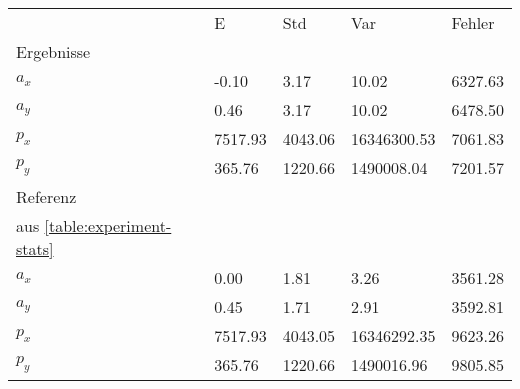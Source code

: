 \begin{tabular}{l|l|l|l|l}

     & E   & Std    & Var    & Fehler \\
\hhline{=|=|=|=|=}

Ergebnisse & & & & \\
$a_x$  &        -0.10 &         3.17 &        10.02 &      6327.63 \\
$a_y$  &         0.46 &         3.17 &        10.02 &      6478.50 \\
$p_x$  &      7517.93 &      4043.06 &  16346300.53 &      7061.83 \\
$p_y$  &       365.76 &      1220.66 &   1490008.04 &      7201.57 \\

\hline
Referenz & & & & \\
aus \ref{table:experiment-stats} & & & & \\
$a_x$  &         0.00 &         1.81 &         3.26 &      3561.28 \\
$a_y$  &         0.45 &         1.71 &         2.91 &      3592.81 \\
$p_x$  &      7517.93 &      4043.05 &  16346292.35 &      9623.26 \\
$p_y$  &       365.76 &      1220.66 &   1490016.96 &      9805.85 \\
\end{tabular}
